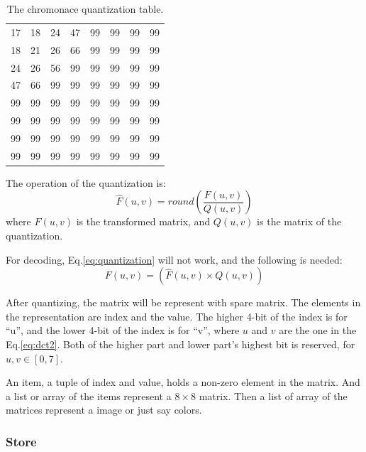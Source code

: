 \documentclass{article}
\begin{document}
\begin{table}
    \centering
    \caption{The chromonace quantization table.}
    \begin{tabular}{rrrrrrrr}
        \hline
        17 & 18 & 24 & 47 & 99 & 99 & 99 & 99 \\ 
        18 & 21 & 26 & 66 & 99 & 99 & 99 & 99 \\ 
        24 & 26 & 56 & 99 & 99 & 99 & 99 & 99 \\ 
        47 & 66 & 99 & 99 & 99 & 99 & 99 & 99 \\ 
        99 & 99 & 99 & 99 & 99 & 99 & 99 & 99 \\ 
        99 & 99 & 99 & 99 & 99 & 99 & 99 & 99 \\ 
        99 & 99 & 99 & 99 & 99 & 99 & 99 & 99 \\ 
        99 & 99 & 99 & 99 & 99 & 99 & 99 & 99 \\
        \hline
    \end{tabular} 
    \label{tab:chromonacequantization}
\end{table}

The operation of the quantization is:
\begin{equation}
\label{eq:quantization}
\widehat{F}(u,v) = round\left(\frac{F(u,v)}{Q(u,v)}\right)
\end{equation}
where $F(u,v)$ is the transformed matrix, and $Q(u,v)$ is the matrix of the quantization.

For decoding, Eq.\ref{eq:quantization} will not work, and the following is needed:
\begin{equation}
\label{eq:iquantization}
F(u,v) = \left(\widehat{F}(u,v) \times Q(u,v)\right)
\end{equation}

After quantizing, the matrix will be represent with spare matrix.
The elements in the representation are index and the value. The higher 4-bit of the index is for ``u'',
and the lower 4-bit of the index is for ``v'', where $u$ and $v$ are the one in the Eq.\ref{eq:dct2}.
Both of the higher part and lower part's highest bit is reserved, for $u,v \in \left[0,7\right]$.

An item, a tuple of index and value, holds a non-zero element in the matrix.
And a list or array of the items represent a $8 \times 8$ matrix.
Then a list of array of the matrices represent a image or just say colors.

\subsubsection{Store}
\label{sec:hpeg:inside:store}
\end{document}
